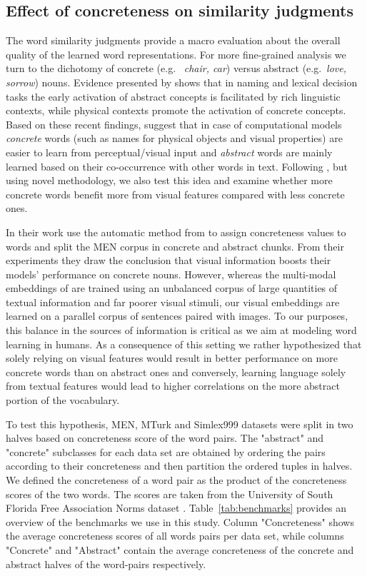 \subsection{Effect of concreteness on similarity judgments}
\label{sec:effect-concrete}
The word similarity judgments provide a macro evaluation about the
overall quality of the learned word representations. For more
fine-grained analysis we turn to the dichotomy of concrete (e.g.\ {\it
  chair, car}) versus abstract (e.g.\ {\it love, sorrow}) nouns.
Evidence presented by \citep{recchia2012semantic} shows that in naming
and lexical decision tasks the early activation of abstract concepts
is facilitated by rich linguistic contexts, while physical contexts
promote the activation of concrete concepts. Based on these recent
findings, \citep{bruni2014multimodal} suggest that in case of
computational models {\it concrete} words (such as names for physical
objects and visual properties) are easier to learn from
perceptual/visual input and {\it abstract} words are mainly learned
based on their co-occurrence with other words in text.  Following
\citep{bruni2014multimodal}, but using novel methodology, we also test
this idea and examine whether more concrete words benefit more from
visual features compared with less concrete ones.

In their work \citep{bruni2014multimodal} use the automatic method from \citep{turney2011literal}
to assign concreteness values to words and split the MEN corpus in
concrete and abstract chunks. From their experiments they draw the
conclusion that visual information boosts their models' performance on
concrete nouns. However, whereas the multi-modal embeddings of
\citep{bruni2014multimodal} are trained using an unbalanced corpus of
large quantities of textual information and far poorer visual stimuli,
our visual embeddings are learned on a parallel corpus of sentences
paired with images. To our purposes, this balance in the sources of
information is critical as we aim at modeling word learning in humans.
As a consequence of this setting we rather hypothesized that solely relying on visual features would result
in better performance on more concrete words than on abstract ones and
conversely, learning language solely from textual features would lead to
higher correlations on the more abstract portion of the vocabulary.

To test this hypothesis, MEN, MTurk and Simlex999 datasets were
split in two halves based on concreteness score of the word pairs.
The "abstract" and "concrete" subclasses for each data set are obtained
by ordering the pairs according to their concreteness and then partition
the ordered tuples in halves\label{rev:partition_concreteness}.
We defined the concreteness of a word pair as the product of the
concreteness scores of the two words. The scores are taken from
the University of South Florida
Free Association Norms dataset \cite{nelsonuniversity}.
Table~\ref{tab:benchmarks} provides an overview of the benchmarks we use in this study.
Column "Concreteness" shows the average concreteness scores of all words pairs per data set,
while columns "Concrete" and "Abstract" contain the average concreteness of the concrete
and abstract halves of the word-pairs respectively.


